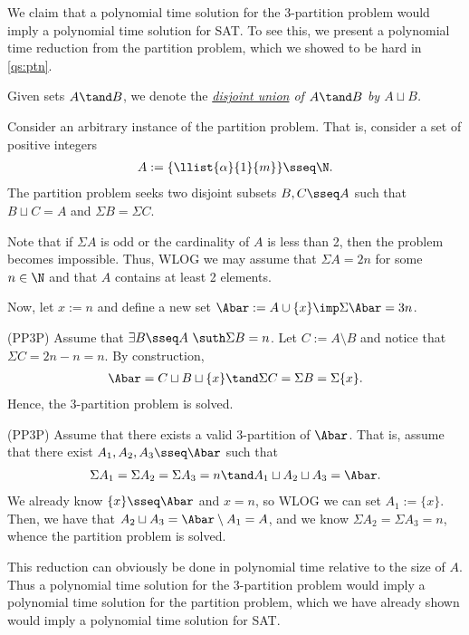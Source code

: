 \documentclass{article}
\begin{document}
\begin{solution}
  We claim that a polynomial time solution for the 3-partition problem would imply a polynomial time solution for SAT.
  To see this, we present a polynomial time reduction from the partition problem, which we showed to be hard in \ref{qs:ptn}.

  \begin{notation}
  Given sets \( A \tand B \), we denote the \it{\href{https://en.wikipedia.org/wiki/Disjoint_union}{disjoint union}} of \( A\tand B \) by \( A\sqcup B \).
  \end{notation}

  Consider an arbitrary instance of the partition problem.
  That is, consider a set of positive integers \begin{align*}
    A := \{\llist{\alpha}{1}{m}\} \sseq \N.
  \end{align*}
  The partition problem seeks two disjoint subsets \( B,C\sseq A \) such that \( B\sqcup C = A \) and \( \Sigma B = \Sigma C \).

  Note that if \( \Sigma A \) is odd or the cardinality of \( A \) is less than 2, then the problem becomes impossible.
  Thus, WLOG we may assume that \( \Sigma A = 2n \) for some \( n\in \N \) and that \( A \) contains at least 2 elements.

  Now, let \( x := n \) and define a new set \( \Abar := A\cup \{x\}\imp \Sigma \Abar = 3n \).

  \begin{subproof}[Correctness.]
    (PP\imp 3P)
    Assume that \( \exists B\sseq A\ \suth \Sigma B = n \).
    Let \( C := A \setminus B \) and notice that \( \Sigma C = 2n - n = n \).
    By construction,
    \begin{align*}
      \Abar = C\sqcup  B \sqcup \{x\} \tand \Sigma C = \Sigma B = \Sigma \{x\}.
    \end{align*}
    Hence, the 3-partition problem is solved.

    (PP\pmi 3P)
    Assume that there exists a valid 3-partition of \( \Abar \).
    That is, assume that there exist \( A_1, A_2, A_3 \sseq \Abar \) such that \begin{align*}
      \Sigma A_1 = \Sigma A_2 = \Sigma A_3 = n \tand A_1 \sqcup A_2 \sqcup A_3 = \Abar.
    \end{align*}
    We already know \( \{x\}\sseq \Abar \) and \( x=n \), so WLOG we can set \( A_1 := \{x\} \).
    Then, we have that \( A_2 \sqcup A_3 = \Abar \setminus A_1 = A \), and we know \( \Sigma A_2 = \Sigma A_3 = n \), whence the partition problem is solved.
  \end{subproof}
  This reduction can obviously be done in polynomial time relative to the size of \( A \).
  Thus a polynomial time solution for the 3-partition problem would imply a polynomial time solution for the partition problem, which we have already shown would imply a polynomial time solution for SAT.
\end{solution}
\pagebreak
\end{document}
